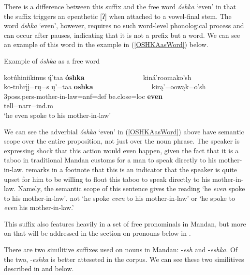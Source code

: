 There is a difference between this suffix and the free word \textit{óshka} `even' in that the suffix triggers an epenthetic [ʔ] when attached to a vowel-final stem. The word \textit{óshka} `even', however, requires no such word-level phonological process and can occur after pauses, indicating that it is not a prefix but a word. We can see an example of this word in the example in (\ref{OSHKAasWord}) below.

\begin{exe}

\item\label{OSHKAasWord} Example of \textit{óshka} as a free word

    \glll kotúhiniikinus ų́'taa \textbf{óshka} ~ ~ ~ ~ ~ ~ ~ ~ ~ ~  kiná'roomako'sh\\
    ko-tuhrįį=rų=s ų'=taa \textbf{oshka} ~ ~ ~ ~ ~ ~ ~ ~ ~ ~  kirą'=oowąk=o'sh\\
    3poss.pers-\textnormal{mother-in-law}=anf=def \textnormal{be.close}=loc \textbf{\textnormal{even}} ~ ~ ~ ~ ~ ~ ~ ~ ~ ~ \textnormal{tell}=narr=ind.m\\
    \glt `he even spoke to his mother-in-law' \citep[182]{trechter2012}

\end{exe}

We can see the adverbial \textit{óshka} `even' in (\ref{OSHKAasWord}) above have semantic scope over the entire proposition, not just over the noun phrase. The speaker is expressing shock that this action would even happen, given the fact that it is a taboo in traditional Mandan customs for a man to speak directly to his mother-in-law. \citet[182]{trechter2012} remarks in a footnote that this is an indicator that the speaker is quite upset for him to be willing to flout this taboo to speak directly to his mother-in-law. Namely, the semantic scope of this sentence gives the reading `he \textit{even} spoke to his mother-in-law', not `he spoke \textit{even} to his mother-in-law' or `he spoke to \textit{even} his mother-in-law.'

This suffix also features heavily in a set of free pronominals in Mandan, but more on that will be addressed in the section on pronouns below in .

\label{NominalSimilitives}

There are two similitive suffixes used on nouns in Mandan: -\textit{esh} and -\textit{eshka}. Of the two, -\textit{eshka} is better atteseted in the corpus. We can see these two similitives described in  and  below.

